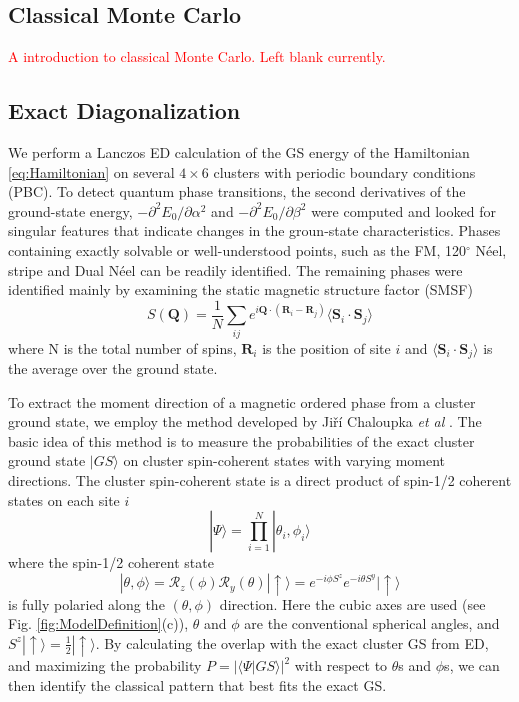 \documentclass[aps,prb,reprint,groupedaddress,showpacs,amsfonts,amsmath,amssymb,superscriptaddress]{revtex4-1}
\begin{document}
\subsection{Classical Monte Carlo}
\textcolor{red}{A introduction to classical Monte Carlo. Left blank currently.}

\subsection{Exact Diagonalization}
We perform a Lanczos ED calculation of the GS energy of the Hamiltonian \eqref{eq:Hamiltonian} on several $4 \times 6$ clusters with periodic boundary conditions (PBC). To detect quantum phase transitions, the second derivatives of the ground-state energy, $-\partial^2E_0/\partial\alpha^2$ and $-\partial^2E_0/\partial\beta^2$ were computed and looked for singular features that indicate changes in the groun-state characteristics. Phases containing exactly solvable or well-understood points, such as the FM, 120$^\circ$ N\'{e}el, stripe and Dual N\'{e}el can be readily identified. The remaining phases were identified mainly by examining the static magnetic structure factor (SMSF)
\begin{equation}
    S(\mathbf{Q}) = \frac{1}{N} \sum_{ij}e^{i\mathbf{Q}\cdot(\mathbf{R}_i - \mathbf{R}_j)} \langle \mathbf{S}_i \cdot \mathbf{S}_j \rangle
    \label{eq:StaticStructureFactor}
\end{equation}
where N is the total number of spins, $\mathbf{R}_i$ is the position of site $i$ and $\langle \mathbf{S}_i \cdot \mathbf{S}_j \rangle$ is the average over the ground state.

To extract the moment direction of a magnetic ordered phase from a cluster ground state, we employ the method developed by Ji\v{r}\'{i} Chaloupka \emph{et  al} \cite{PhysRevB.94.064435}. The basic idea of this method is to measure the probabilities of the exact cluster ground state $|GS\rangle$ on cluster spin-coherent states with varying moment directions. The cluster spin-coherent state is a direct product of spin-1/2 coherent states on each site $i$
\begin{equation}
    |\Psi\rangle = \prod_{i=1}^N|\theta_i,\phi_i\rangle
    \label{eq:ClusterCoherentState}
\end{equation}
where the spin-1/2 coherent state
\begin{equation}
    |\theta, \phi \rangle = \mathcal{R}_z(\phi) \mathcal{R}_y(\theta) |\uparrow \rangle = e^{-i\phi S^z} e^{-i\theta S^y} |\uparrow\rangle
    \label{eq:Spin-1/2CoherentState}
\end{equation}
is fully polaried along the $(\theta, \phi)$ direction. Here the cubic axes are used (see Fig. \ref{fig:ModelDefinition}(c)), $\theta$ and $\phi$ are the conventional spherical angles, and $S^z |\uparrow \rangle = \frac{1}{2}|\uparrow \rangle$. By calculating the overlap with the exact cluster GS from ED, and maximizing the probability $P = |\langle \Psi | GS \rangle|^2$ with respect to $\theta$s and $\phi$s, we can then identify the classical pattern that best fits the exact GS.
\end{document}
